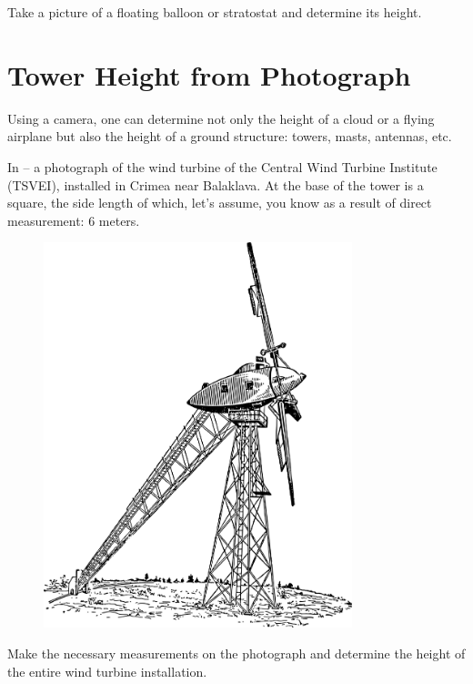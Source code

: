 Take a picture of a floating balloon or stratostat and determine its height.

\clearpage

\section{Tower Height from Photograph}

\ques Using a camera, one can determine not only the height of a cloud or a flying airplane but also the height of a ground structure: towers, masts, antennas, etc.

In  -- a photograph of the wind turbine of the Central Wind Turbine Institute (TSVEI), installed in Crimea near Balaklava. At the base of the tower is a square, the side length of which, let's assume, you know as a result of direct measurement: 6 meters.

\begin{figure}[h!]
\centering
\includegraphics[width=0.8\textwidth]{figures/ch-03/fig-078.pdf}
\end{figure}

Make the necessary measurements on the photograph and determine the height of the entire wind turbine installation.


